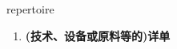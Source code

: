 
\begin{frame}
{\huge repertoire}
\begin{center}
\begin{enumerate}\Large
  \item \textbf{(技术、设备或原料等的)详单}
\end{enumerate}
\end{center}
\end{frame}
